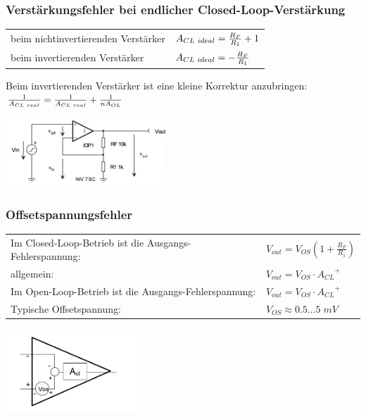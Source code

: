 		\subsubsection{Verstärkungsfehler bei endlicher Closed-Loop-Verstärkung}
			\begin{minipage}{12cm}
				\begin{tabular}{ll}
               	beim nichtinvertierenden Verstärker &
               	$A_{CL \hspace{1mm} ideal}=\frac{R_F}{R_1}+1$\\
               	beim invertierenden Verstärker &
                $A_{CL \hspace{1mm}
               	ideal}=-\frac{R_F}{R_1}$\\
         \end{tabular}
               	Beim invertierenden Verstärker ist eine kleine Korrektur
               	anzubringen: \\
               	$\frac{1}{A_{CL \hspace{1mm}
               	real}}=\frac{1}{A_{CL \hspace{1mm} real}}+\frac{1}{nA_{OL}}$\\
	        \end{minipage}
			\begin{minipage}{6cm}
               	\includegraphics[width=6cm]{./images/verstaerkungsfaktor.png}
            \end{minipage}
            
		\subsubsection{Offsetspannungsfehler}
			\begin{minipage}{14cm}
				\begin{tabular}{ll}
					Im Closed-Loop-Betrieb ist die Ausgangs-Fehlerspannung: &
					$V_{out}=V_{OS}\left( 1+\frac{R_F}{R_1}\right)$\\
          			allgemein: &
       		   		$V_{out}=V_{OS} \cdot {A_{CL}}^{+}$\\
         			Im Open-Loop-Betrieb ist die Ausgangs-Fehlerspannung: &
          			$V_{out}=V_{OS}\cdot {A_{CL}}^{+}$\\
          			Typische Offsetspannung: & $V_{OS} \approx 0.5 \dots 5 \; mV$
         		\end{tabular}
         	\end{minipage}
         	\begin{minipage}{5cm}
         		\includegraphics[width=5cm]{images/opOffset}
         	\end{minipage}
		
